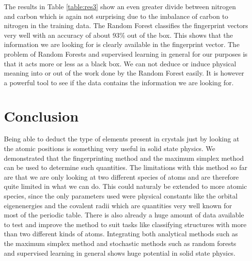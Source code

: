 The results in Table \ref{table:res3} show an even greater divide between nitrogen and carbon which is again not surprising due to the imbalance of carbon to nitrogen in the training data. The Random Forest classifies the fingerprint vectors very well with an accuracy of about 93\% out of the box. This shows that the information we are looking for is clearly available in the fingerprint vector. The problem of Random Forests and supervised learning in general for our purposes is that it acts more or less as a black box. We can not deduce or induce physical meaning into or out of the work done by the Random Forest easily. It is however a powerful tool to see if the data contains the information we are looking for.

\section{Conclusion}
Being able to deduct the type of elements present in crystals just by looking at the atomic positions is something very useful in solid state physics. We demonstrated that the fingerprinting method and the maximum simplex method can be used to determine such quantities. The limitations with this method so far are that we are only looking at two different species of atoms and are therefore quite limited in what we can do. This could naturaly be extended to more atomic species, since the only parameters used were physical constants like the orbital eigenenergies and the covalent radii which are quantities very well known for most of the periodic table. There is also already a huge amount of data available to test and improve the method to suit tasks like classifying structures with more than two different kinds of atoms. Integrating both analytical methods such as the maximum simplex method and stochastic methods such as random forests and supervised learning in general shows huge potential in solid state physics.

